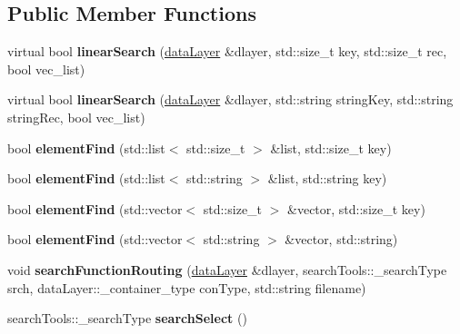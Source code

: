 \subsection*{Public Member Functions}
\begin{DoxyCompactItemize}
\item 
\hypertarget{classsearch_tools_adaeb42ca9640d29a100373f7a4bc27e2}{}virtual bool {\bfseries linear\+Search} (\hyperlink{classdata_layer}{data\+Layer} \&dlayer, std\+::size\+\_\+t key, std\+::size\+\_\+t rec, bool vec\+\_\+list)\label{classsearch_tools_adaeb42ca9640d29a100373f7a4bc27e2}

\item 
\hypertarget{classsearch_tools_adfd03735dd20fec599a1d4c0e50375a0}{}virtual bool {\bfseries linear\+Search} (\hyperlink{classdata_layer}{data\+Layer} \&dlayer, std\+::string string\+Key, std\+::string string\+Rec, bool vec\+\_\+list)\label{classsearch_tools_adfd03735dd20fec599a1d4c0e50375a0}

\item 
\hypertarget{classsearch_tools_a956cf1c9629b15f4610ed71e409c77b1}{}bool {\bfseries element\+Find} (std\+::list$<$ std\+::size\+\_\+t $>$ \&list, std\+::size\+\_\+t key)\label{classsearch_tools_a956cf1c9629b15f4610ed71e409c77b1}

\item 
\hypertarget{classsearch_tools_afcdbe186a67a1f594a73db0f0dc3da40}{}bool {\bfseries element\+Find} (std\+::list$<$ std\+::string $>$ \&list, std\+::string key)\label{classsearch_tools_afcdbe186a67a1f594a73db0f0dc3da40}

\item 
\hypertarget{classsearch_tools_a894018c55b921bfe8069bf6080e4bb96}{}bool {\bfseries element\+Find} (std\+::vector$<$ std\+::size\+\_\+t $>$ \&vector, std\+::size\+\_\+t key)\label{classsearch_tools_a894018c55b921bfe8069bf6080e4bb96}

\item 
\hypertarget{classsearch_tools_a6cb8b3b063e770b2e6b52e8e20999cfa}{}bool {\bfseries element\+Find} (std\+::vector$<$ std\+::string $>$ \&vector, std\+::string)\label{classsearch_tools_a6cb8b3b063e770b2e6b52e8e20999cfa}

\item 
\hypertarget{classsearch_tools_ac7ee5bde189487c52868cd97e05fbdb6}{}void {\bfseries search\+Function\+Routing} (\hyperlink{classdata_layer}{data\+Layer} \&dlayer, search\+Tools\+::\+\_\+search\+Type srch, data\+Layer\+::\+\_\+container\+\_\+type con\+Type, std\+::string filename)\label{classsearch_tools_ac7ee5bde189487c52868cd97e05fbdb6}

\item 
\hypertarget{classsearch_tools_a5c6bb52d9e52decd92d6700f12158751}{}search\+Tools\+::\+\_\+search\+Type {\bfseries search\+Select} ()\label{classsearch_tools_a5c6bb52d9e52decd92d6700f12158751}

\end{DoxyCompactItemize}
